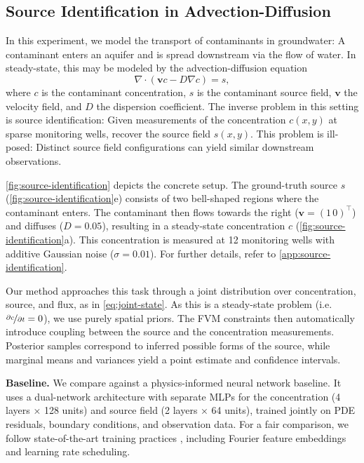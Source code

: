 \documentclass{article}
\theoremstyle{plain}
\theoremstyle{definition}
\theoremstyle{remark}
\newcommand{\bv}{\mathbf{v}}
\begin{document}
\subsection{Source Identification in Advection-Diffusion}
\label{sec:source-identification}

In this experiment, we model the transport of contaminants in groundwater:
A contaminant enters an aquifer and is spread downstream via the flow of water.
In steady-state, this may be modeled by the advection-diffusion equation
\begin{equation}
  \nabla \cdot (\bv c - D \nabla c) = s,
  \label{eq:advection-diffusion}
\end{equation}
where $c$ is the contaminant concentration, $s$ is the contaminant source field, $\mathbf{v}$ the velocity field, and $D$ the dispersion coefficient.
The inverse problem in this setting is source identification:
Given measurements of the concentration $c(x, y)$ at sparse monitoring wells, recover the source field $s(x, y)$.
This problem is ill-posed:
Distinct source field configurations can yield similar downstream observations.

\cref{fig:source-identification} depicts the concrete setup.
The ground-truth source $s$ (\cref{fig:source-identification}e) consists of two bell-shaped regions where the contaminant enters.
The contaminant then flows towards the right ($\bm{v} = (1 \, 0)^{\top}$) and diffuses ($D = 0.05$), resulting in a steady-state concentration $c$ (\cref{fig:source-identification}a).
This concentration is measured at 12 monitoring wells with additive Gaussian noise ($\sigma = 0.01$).
For further details, refer to \cref{app:source-identification}.

Our method approaches this task through a joint distribution over concentration, source, and flux, as in \cref{eq:joint-state}.
As this is a steady-state problem (i.e.\  $\nicefrac{\partial c}{\partial t} = 0$), we use purely spatial priors.
The FVM constraints then automatically introduce coupling between the source and the concentration measurements.
Posterior samples correspond to inferred possible forms of the source, while marginal means and variances yield a point estimate and confidence intervals.

\textbf{Baseline.}
We compare against a physics-informed neural network \citep{raissiPhysicsinformedNeuralNetworks2019} baseline.
It uses a dual-network architecture with separate MLPs for the concentration (4 layers × 128 units) and source field (2 layers × 64 units), trained jointly on PDE residuals, boundary conditions, and observation data.
For a fair comparison, we follow state-of-the-art training practices \citep{wangExpertsGuideTraining2023a}, including Fourier feature embeddings and learning rate scheduling.
\end{document}
